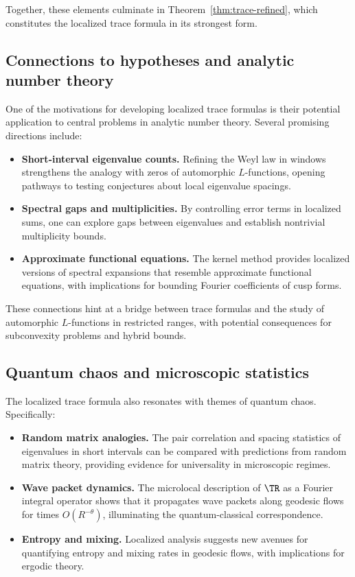 Together, these elements culminate in Theorem~\ref{thm:trace-refined}, which constitutes the localized trace formula in its strongest form.

\subsection{Connections to hypotheses and analytic number theory}\label{subsec:connections}

One of the motivations for developing localized trace formulas is their potential application to central problems in analytic number theory. Several promising directions include:

\begin{itemize}
\item \textbf{Short-interval eigenvalue counts.} Refining the Weyl law in windows strengthens the analogy with zeros of automorphic $L$-functions, opening pathways to testing conjectures about local eigenvalue spacings.
\item \textbf{Spectral gaps and multiplicities.} By controlling error terms in localized sums, one can explore gaps between eigenvalues and establish nontrivial multiplicity bounds.
\item \textbf{Approximate functional equations.} The kernel method provides localized versions of spectral expansions that resemble approximate functional equations, with implications for bounding Fourier coefficients of cusp forms.
\end{itemize}

These connections hint at a bridge between trace formulas and the study of automorphic $L$-functions in restricted ranges, with potential consequences for subconvexity problems and hybrid bounds.

\subsection{Quantum chaos and microscopic statistics}\label{subsec:quantum-chaos}

The localized trace formula also resonates with themes of quantum chaos. Specifically:

\begin{itemize}
\item \textbf{Random matrix analogies.} The pair correlation and spacing statistics of eigenvalues in short intervals can be compared with predictions from random matrix theory, providing evidence for universality in microscopic regimes.
\item \textbf{Wave packet dynamics.} The microlocal description of $\TR$ as a Fourier integral operator shows that it propagates wave packets along geodesic flows for times $O(R^{-\theta})$, illuminating the quantum-classical correspondence.
\item \textbf{Entropy and mixing.} Localized analysis suggests new avenues for quantifying entropy and mixing rates in geodesic flows, with implications for ergodic theory.
\end{itemize}

